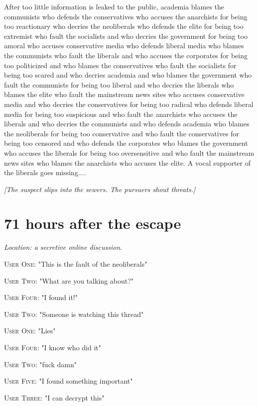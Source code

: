 \documentclass{report}
\begin{document}
After too little information is leaked to the public, academia blames the communists who defends the conservatives who accuses the anarchists for being too reactionary who decries the neoliberals who defends the elite for being too extremist who fault the socialists and who decries the government for being too amoral who accuses conservative media who defends liberal media who blames the communists who fault the liberals and who accuses the corporates for being too politicized and who blames the conservatives who fault the socialists for being too scared and who decries academia and who blames the government who fault the communists for being too liberal and who decries the liberals who blames the elite who fault the mainstream news sites who accuses conservative media and who decries the conservatives for being too radical who defends liberal media for being too suspicious and who fault the anarchists who accuses the liberals and who decries the communists and who defends academia who blames the neoliberals for being too conservative and who fault the conservatives for being too censored and who defends the corporates who blames the government who accuses the liberals for being too oversensitive and who fault the mainstream news sites who blames the anarchists who accuses the elite. A vocal supporter of the liberals goes missing....

\textit{[The suspect slips into the sewers. The pursuers shout threats.]}


\section*{71 \small{hours after the escape}}

\textit{Location: a secretive online discussion}. 

\textsc{User One}: "This is the fault of the neoliberals" 

\textsc{User Two}: "What are you talking about?" 

\textsc{User Four}: "I found it!" 

\textsc{User Two}: "Someone is watching this thread" 

\textsc{User One}: "Lies" 

\textsc{User Four}: "I know who did it" 

\textsc{User Two}: "fuck damn" 

\textsc{User Five}: "I found something important" 

\textsc{User Three}: "I can decrypt this" 
\end{document}
